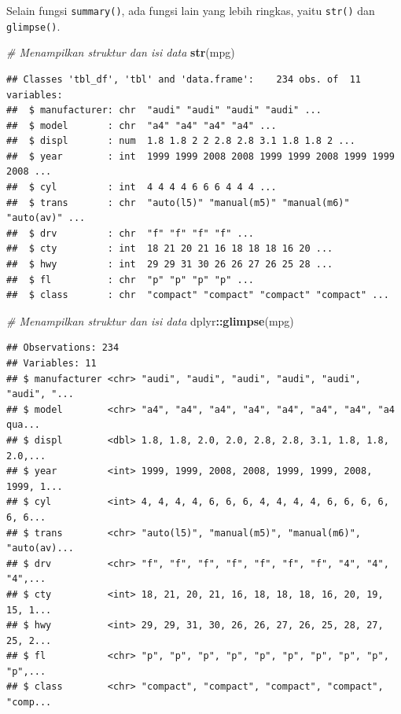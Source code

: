 \documentclass[openany]{book}
\newenvironment{Shaded}{\begin{snugshade}}{\end{snugshade}}
\newcommand{\KeywordTok}[1]{\textcolor[rgb]{0.13,0.29,0.53}{\textbf{#1}}}
\newcommand{\CommentTok}[1]{\textcolor[rgb]{0.56,0.35,0.01}{\textit{#1}}}
\newcommand{\OperatorTok}[1]{\textcolor[rgb]{0.81,0.36,0.00}{\textbf{#1}}}
\newcommand{\NormalTok}[1]{#1}
\begin{document}
Selain fungsi \texttt{summary()}, ada fungsi lain yang lebih ringkas,
yaitu \texttt{str()} dan \texttt{glimpse()}.

\begin{Shaded}
\begin{Highlighting}[]
\CommentTok{# Menampilkan struktur dan isi data}
\KeywordTok{str}\NormalTok{(mpg)}
\end{Highlighting}
\end{Shaded}

\begin{verbatim}
## Classes 'tbl_df', 'tbl' and 'data.frame':    234 obs. of  11 variables:
##  $ manufacturer: chr  "audi" "audi" "audi" "audi" ...
##  $ model       : chr  "a4" "a4" "a4" "a4" ...
##  $ displ       : num  1.8 1.8 2 2 2.8 2.8 3.1 1.8 1.8 2 ...
##  $ year        : int  1999 1999 2008 2008 1999 1999 2008 1999 1999 2008 ...
##  $ cyl         : int  4 4 4 4 6 6 6 4 4 4 ...
##  $ trans       : chr  "auto(l5)" "manual(m5)" "manual(m6)" "auto(av)" ...
##  $ drv         : chr  "f" "f" "f" "f" ...
##  $ cty         : int  18 21 20 21 16 18 18 18 16 20 ...
##  $ hwy         : int  29 29 31 30 26 26 27 26 25 28 ...
##  $ fl          : chr  "p" "p" "p" "p" ...
##  $ class       : chr  "compact" "compact" "compact" "compact" ...
\end{verbatim}

\begin{Shaded}
\begin{Highlighting}[]
\CommentTok{# Menampilkan struktur dan isi data}
\NormalTok{dplyr}\OperatorTok{::}\KeywordTok{glimpse}\NormalTok{(mpg)}
\end{Highlighting}
\end{Shaded}

\begin{verbatim}
## Observations: 234
## Variables: 11
## $ manufacturer <chr> "audi", "audi", "audi", "audi", "audi", "audi", "...
## $ model        <chr> "a4", "a4", "a4", "a4", "a4", "a4", "a4", "a4 qua...
## $ displ        <dbl> 1.8, 1.8, 2.0, 2.0, 2.8, 2.8, 3.1, 1.8, 1.8, 2.0,...
## $ year         <int> 1999, 1999, 2008, 2008, 1999, 1999, 2008, 1999, 1...
## $ cyl          <int> 4, 4, 4, 4, 6, 6, 6, 4, 4, 4, 4, 6, 6, 6, 6, 6, 6...
## $ trans        <chr> "auto(l5)", "manual(m5)", "manual(m6)", "auto(av)...
## $ drv          <chr> "f", "f", "f", "f", "f", "f", "f", "4", "4", "4",...
## $ cty          <int> 18, 21, 20, 21, 16, 18, 18, 18, 16, 20, 19, 15, 1...
## $ hwy          <int> 29, 29, 31, 30, 26, 26, 27, 26, 25, 28, 27, 25, 2...
## $ fl           <chr> "p", "p", "p", "p", "p", "p", "p", "p", "p", "p",...
## $ class        <chr> "compact", "compact", "compact", "compact", "comp...
\end{verbatim}
\end{document}
